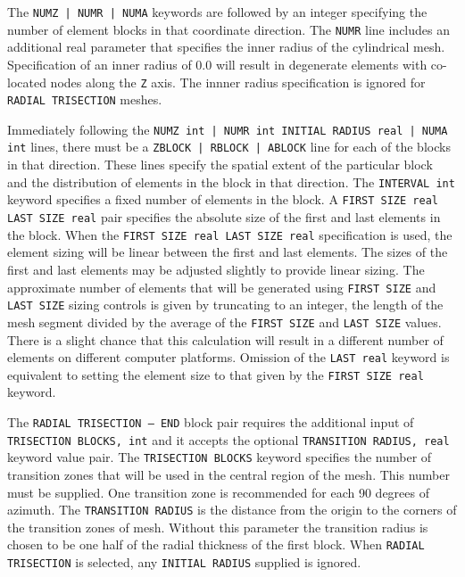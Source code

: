 The \texttt{NUMZ | NUMR | NUMA} keywords are followed by an integer
specifying the number
of element blocks in that coordinate direction. The
\texttt{NUMR} line includes an additional real parameter that
specifies the inner radius of the cylindrical mesh. Specification of
an inner radius of 0.0 will result in degenerate elements with
co-located nodes along the \texttt{Z} axis. The innner radius
specification is ignored for \texttt{RADIAL TRISECTION} meshes.

Immediately following
the \texttt{NUMZ int | NUMR int INITIAL RADIUS real | NUMA int} lines, there must be a \texttt{ZBLOCK |
  RBLOCK | ABLOCK} line for each of the blocks in that direction.
These lines specify the spatial extent of the particular block and the
distribution of elements in the block in that direction. The \texttt{INTERVAL int} keyword
specifies a fixed number of elements in the
block. A \texttt{FIRST SIZE real LAST SIZE real} pair specifies the absolute
size of the first and last elements in the block. When the \texttt{FIRST SIZE real LAST SIZE real} specification is
used, the element sizing will be linear between the first and last
elements. The sizes of the first and last elements may be
adjusted slightly to provide linear sizing. The approximate number of elements that will be generated using \texttt{FIRST SIZE} and \texttt{LAST SIZE} sizing controls is given by truncating to an integer, the length of the mesh segment divided by the average of the \texttt{FIRST SIZE} and \texttt {LAST SIZE} values. There is a slight chance that this calculation will result in a different number of elements on different computer platforms.  Omission of the
\texttt{LAST real} keyword is equivalent to setting the element size
to that given by the \texttt{FIRST SIZE real} keyword.

The \texttt{RADIAL TRISECTION -- END} block pair requires the
additional input of \texttt{TRISECTION BLOCKS, int} and it accepts the
optional \texttt{TRANSITION RADIUS, real} keyword value pair.  The
\texttt{TRISECTION BLOCKS} keyword specifies the number of transition
zones that will be used in the central region of the mesh. This
number must be supplied. One transition zone is recommended for each
90 degrees of azimuth.  The \texttt{TRANSITION RADIUS} is the distance
from the origin to the corners of the transition zones of
mesh. Without this parameter the transition radius is chosen to be one
half of the radial thickness of the first block.  When \texttt{RADIAL TRISECTION} is selected, any \texttt{INITIAL RADIUS} supplied is
  ignored.

